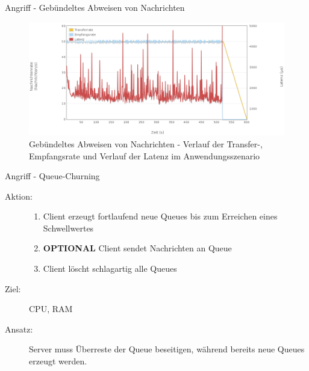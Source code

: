 \documentclass[10pt]{beamer}
\begin{document}
\begin{frame}{Angriff - Gebündeltes Abweisen von Nachrichten}	
\begin{figure}[!htb]
	\centering
	\includegraphics[width=\textwidth]{img/nack/nack_scenario.png}
	\caption{\centering Gebündeltes Abweisen von Nachrichten - Verlauf der Transfer-, Empfangsrate und Verlauf der Latenz im Anwendungsszenario}
	\label{fig:nack-scenario}
\end{figure}
\end{frame}

\begin{frame}[t]{Angriff - Queue-Churning}
\begin{description}
	\item[Aktion:]
		\begin{enumerate}
			\item Client erzeugt fortlaufend neue Queues bis zum Erreichen eines Schwellwertes
			\item \textbf{OPTIONAL} Client sendet Nachrichten an Queue 
			\item Client löscht schlagartig alle Queues
		\end{enumerate}  \smallskip
	\item[Ziel:] CPU, RAM \smallskip
	\item[Ansatz:] Server muss Überreste der Queue beseitigen, während bereits neue Queues erzeugt werden.
\end{description}
\end{frame}
\end{document}
